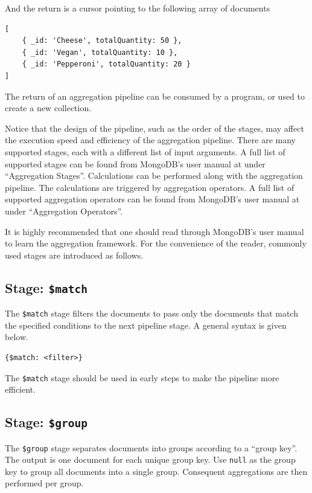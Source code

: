 And the return is a cursor pointing to the following array of documents
\begin{lstlisting}
[
	{ _id: 'Cheese', totalQuantity: 50 },
	{ _id: 'Vegan', totalQuantity: 10 },
	{ _id: 'Pepperoni', totalQuantity: 20 }
]
\end{lstlisting}

The return of an aggregation pipeline can be consumed by a program, or used to create a new collection.

Notice that the design of the pipeline, such as the order of the stages, may affect the execution speed and efficiency of the aggregation pipeline. There are many supported stages, each with a different list of input arguments. A full list of supported stages can be found from MongoDB's user manual at \cite{mongodb2024aggregation} under ``Aggregation Stages''. Calculations can be performed along with the aggregation pipeline. The calculations are triggered by aggregation operators. A full list of supported aggregation operators can be found from MongoDB's user manual at \cite{mongodb2024aggregationoperators} under ``Aggregation Operators''.

It is highly recommended that one should read through MongoDB's user manual to learn the aggregation framework. For the convenience of the reader, commonly used stages are introduced as follows.

\subsection{Stage: \texttt{\$match}}

The \verb|$match| stage filters the documents to pass only the documents that match the specified conditions to the next pipeline stage. A general syntax is given below.
\begin{lstlisting}
{$match: <filter>}
\end{lstlisting}

The \verb|$match| stage should be used in early steps to make the pipeline more efficient.

\subsection{Stage: \texttt{\$group}}

The \verb|$group| stage separates documents into groups according to a ``group key''. The output is one document for each unique group key. Use \verb|null| as the group key to group all documents into a single group. Consequent aggregations are then performed per group.

